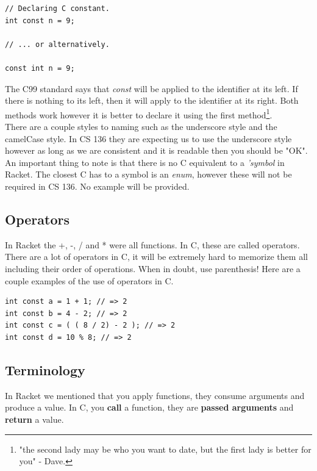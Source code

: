 \documentclass[12pt,extarticle]{article}
\begin{document}
\lstset {
	language=c
}
\begin{lstlisting}
// Declaring C constant.
int const n = 9;

// ... or alternatively.

const int n = 9;
\end{lstlisting}

The C99 standard says that \emph{const} will be applied to the identifier at its left. If there is nothing to its left, then it will apply to the identifier at its right. Both methods work however it is better to declare it using the first method\footnote{"the second lady may be who you want to date, but the first lady is better for you" - Dave.}.\\

There are a couple styles to naming such as the underscore style and the camelCase style. In CS 136 they are expecting us to use the underscore style however as long as we are consistent and it is readable then you should be "OK".\\

An important thing to note is that there is no C equivalent to a \emph{'symbol} in Racket. The closest C has to a symbol is an \emph{enum}, however these will not be required in CS 136. No example will be provided.

\subsection{Operators}

In Racket the +, -, / and * were all functions. In C, these are called operators. There are a lot of operators in C, it will be extremely hard to memorize them all including their order of operations. When in doubt, use parenthesis! Here are a couple examples of the use of operators in C.\\

\lstset {
	language=c
}
\begin{lstlisting}
int const a = 1 + 1; // => 2
int const b = 4 - 2; // => 2
int const c = ( ( 8 / 2) - 2 ); // => 2
int const d = 10 % 8; // => 2
\end{lstlisting}

\subsection{Terminology}

In Racket we mentioned that you apply functions, they consume arguments and produce a value. In C, you \textbf{call} a function, they are \textbf{passed arguments} and \textbf{return} a value.\\
\end{document}

